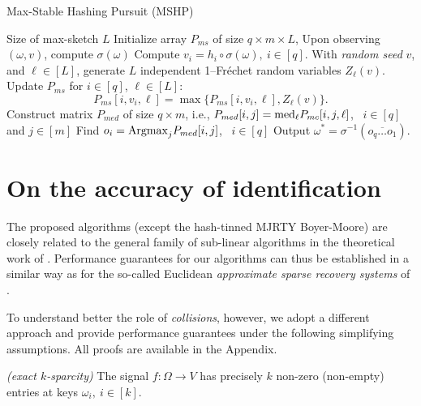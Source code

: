 \documentclass[10pt, conference, letterpaper,onecolumn]{IEEEtranv1.8}
\theoremstyle{plain}\newtheorem{thm}{Theorem}\newtheorem{lem}{Lemma}
\theoremstyle{definition}
\begin{document}
\begin{algorithm}[t]
\caption{Max-Stable Hashing Pursuit (MSHP)}
\label{alg:mshp}
\begin{algorithmic}[1]
\REQUIRE Size of max-sketch $L$
\STATE [Start]    Initialize array $P_{ms}$ of size $q\times m \times L$,
\STATE [Permute]  Upon observing $(\omega, v)$, compute $\sigma (\omega)$
\STATE [Hash]  Compute $v_i = h_i\circ \sigma (\omega), \ i \in [q]$.
\STATE [RNG]  With \emph{random seed} $v$, and $\ell\in[L]$, generate $L$ independent 1--Fr\'echet random variables $Z_\ell(v)$.
\STATE [Update]    Update $P_{ms}$ for $i \in [q]$, $\ell\in[L]$:
   $$
    P_{ms}[i, v_i, \ell ]  = \max \{P_{ms}[i, v_i, \ell ], Z_\ell(v) \}.
   $$
 \vspace{-10pt}  
   \STATE Construct matrix $P_{med}$ of size $q\times m$, i.e.,
   \STATE $ P_{med}[i, j] = {\rm med}_{\ell} P_{mc}[i,j,\ell]$, \ $i\in[q]$ and $j\in [m]$ 
   \STATE Find $o_i = {\rm Argmax}_{j} P_{med}[i,j]$, \ $i\in[q]$ 
 \STATE [Decode]  Output $\omega^* = \sigma^{-1}(\overline{o_q \ldots o_1})$. 
 \ENDIF    
\end{algorithmic}
\end{algorithm} 
  
  
  
  






\section{On the accuracy of identification}
\label{sec:bounds}

 The proposed algorithms (except the hash-tinned MJRTY Boyer-Moore) are closely related to the general family 
 of sub-linear algorithms in the theoretical work of \cite{Porat:2012:STM:2095116.2095212}. Performance guarantees 
 for our algorithms can thus be established in a similar way as for the so-called Euclidean 
 {\em approximate sparse recovery systems} of  \cite{doi:10.1137/100816705}.  

To understand better the role of {\em collisions}, however, we adopt a different approach and provide 
performance guarantees under the following simplifying assumptions.  All  proofs are available in the 
Appendix.

\smallskip
{} {\em (exact $k$-sparcity)} The signal $f:\Omega\to V$ has precisely $k$ non-zero (non-empty) entries
at keys $\omega_i,\ i\in [k]$.
\end{document}
